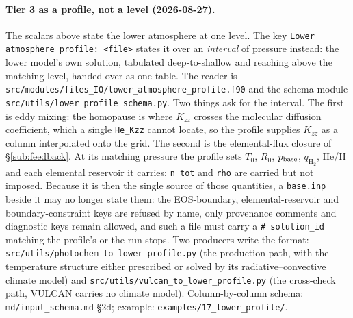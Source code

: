 \documentclass[english,a4paper]{my_memo}
\newcommand{\qHH}{q_{\mathrm{H_2}}}
\begin{document}
\paragraph{Tier 3 as a profile, not a level (2026-08-27).}
The scalars above state the lower atmosphere at one level. The key
\texttt{Lower atmosphere profile: <file>} states it over an \emph{interval} of
pressure instead: the lower model's own solution, tabulated deep-to-shallow and
reaching above the matching level, handed over as one table. The reader is
\texttt{src/modules/files\_IO/\allowbreak lower\_atmosphere\_profile.f90} and the
schema module \texttt{src/utils/\allowbreak lower\_profile\_\allowbreak schema.py}.
Two things ask for the interval.
The first is eddy mixing: the homopause is where $K_{zz}$ crosses the molecular
diffusion coefficient, which a single \texttt{He\_Kzz} cannot locate, so the
profile supplies $K_{zz}$ as a column interpolated onto the grid. The second is
the elemental-flux closure of \S\ref{sub:feedback}. At its matching pressure the
profile sets $T_0$, $R_0$, $p_{\rm base}$, $\qHH$, He/H and each elemental
reservoir it carries; \texttt{n\_tot} and \texttt{rho} are carried but not
imposed. Because it is then the single source of those quantities, a
\texttt{base.inp} beside it may no longer state them: the EOS-boundary,
elemental-reservoir and boundary-constraint keys are refused by name, only
provenance comments and diagnostic keys remain allowed, and such a file must
carry a \texttt{\# solution\_id} matching the profile's or the run stops. Two
producers write the format: \texttt{src/utils/photochem\_to\_lower\_profile.py}
(the production path, with the temperature structure either prescribed or solved
by its radiative--convective climate model) and
\texttt{src/utils/vulcan\_to\_lower\_profile.py} (the cross-check path, VULCAN
carries no climate model). Column-by-column schema:
\texttt{md/input\_schema.md} \S2d; example: \texttt{examples/17\_lower\_profile/}.
\end{document}
